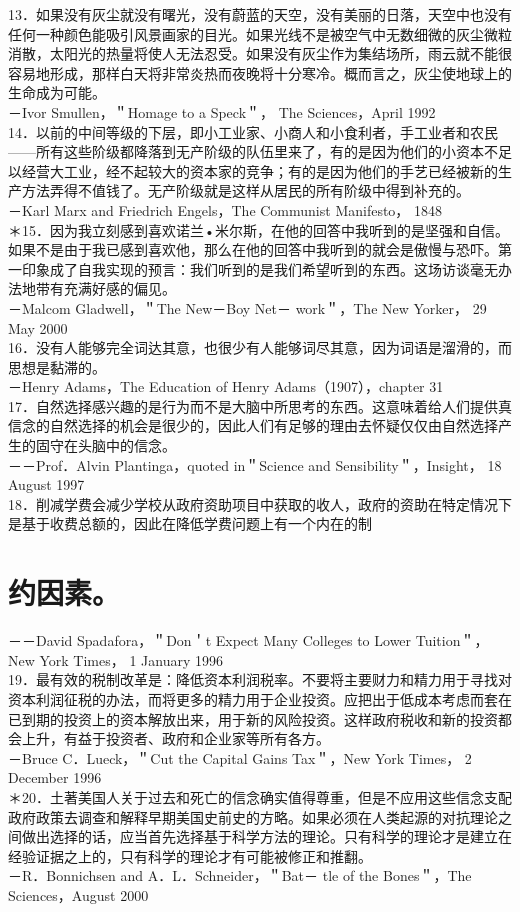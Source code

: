 13．如果没有灰尘就没有曙光，没有蔚蓝的天空，没有美丽的日落，天空中也没有任何一种颜色能吸引风景画家的目光。如果光线不是被空气中无数细微的灰尘微粒消散，太阳光的热量将使人无法忍受。如果没有灰尘作为集结场所，雨云就不能很容易地形成，那样白天将非常炎热而夜晚将十分寒冷。概而言之，灰尘使地球上的生命成为可能。\\
－Ivor Smullen，＂Homage to a Speck＂， The Sciences，April 1992\\
14．以前的中间等级的下层，即小工业家、小商人和小食利者，手工业者和农民——所有这些阶级都降落到无产阶级的队伍里来了，有的是因为他们的小资本不足以经营大工业，经不起较大的资本家的竞争；有的是因为他们的手艺已经被新的生产方法弄得不值钱了。无产阶级就是这样从居民的所有阶级中得到补充的。\\
－Karl Marx and Friedrich Engels，The Communist Manifesto， 1848\\
＊15．因为我立刻感到喜欢诺兰•米尔斯，在他的回答中我听到的是坚强和自信。如果不是由于我已感到喜欢他，那么在他的回答中我听到的就会是傲慢与恐吓。第一印象成了自我实现的预言：我们听到的是我们希望听到的东西。这场访谈毫无办法地带有充满好感的偏见。\\
－Malcom Gladwell，＂The New－Boy Net－ work＂，The New Yorker， 29 May 2000\\
16．没有人能够完全词达其意，也很少有人能够词尽其意，因为词语是溜滑的，而思想是黏滞的。\\
－Henry Adams，The Education of Henry Adams（1907），chapter 31\\
17．自然选择感兴趣的是行为而不是大脑中所思考的东西。这意味着给人们提供真信念的自然选择的机会是很少的，因此人们有足够的理由去怀疑仅仅由自然选择产生的固守在头脑中的信念。\\
－－Prof．Alvin Plantinga，quoted in＂Science and Sensibility＂，Insight， 18 August 1997\\
18．削减学费会减少学校从政府资助项目中获取的收人，政府的资助在特定情况下是基于收费总额的，因此在降低学费问题上有一个内在的制

\section*{约因素。}
－－David Spadafora，＂Don＇t Expect Many Colleges to Lower Tuition＂，New York Times， 1 January 1996\\
19．最有效的税制改革是：降低资本利润税率。不要将主要财力和精力用于寻找对资本利润征税的办法，而将更多的精力用于企业投资。应把出于低成本考虑而套在已到期的投资上的资本解放出来，用于新的风险投资。这样政府税收和新的投资都会上升，有益于投资者、政府和企业家等所有各方。\\
－Bruce C．Lueck，＂Cut the Capital Gains Tax＂，New York Times， 2 December 1996\\
＊20．土著美国人关于过去和死亡的信念确实值得尊重，但是不应用这些信念支配政府政策去调查和解释早期美国史前史的方略。如果必须在人类起源的对抗理论之间做出选择的话，应当首先选择基于科学方法的理论。只有科学的理论才是建立在经验证据之上的，只有科学的理论才有可能被修正和推翻。\\
－R．Bonnichsen and A．L．Schneider，＂Bat－ tle of the Bones＂，The Sciences，August 2000

